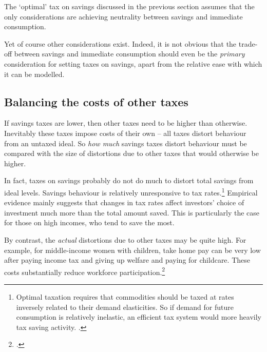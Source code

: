 The ‘optimal’ tax on savings discussed in the previous section assumes that the only considerations are achieving neutrality between savings and immediate consumption.

Yet of course other considerations exist. Indeed, it is not obvious that the trade-off between savings and immediate consumption should even be the \emph{primary} consideration for setting taxes on savings, apart from the relative ease with which it can be modelled.
\subsection{Balancing the costs of other taxes}
If savings taxes are lower, then other taxes need to be higher than otherwise. Inevitably these taxes impose costs of their own – all taxes distort behaviour from an untaxed ideal. So \emph{how much} savings taxes distort behaviour must be compared with the size of distortions due to other taxes that would otherwise be higher.

In fact, taxes on savings probably do not do much to distort total savings from ideal levels. Savings behaviour is relatively unresponsive to tax rates.\footnote{Optimal taxation requires that commodities should be taxed at rates inversely related to their demand elasticities. So if demand for future consumption is relatively inelastic, an efficient tax system would more heavily tax saving activity. \textcite[See:][21--22]{Ingles2015}.}  Empirical evidence mainly suggests that changes in tax rates affect investors’ choice of investment much more than the total amount saved. This is particularly the case for those on high incomes, who tend to save the most.

By contrast, the \emph{actual} distortions due to other taxes may be quite high. For example, for middle-income women with children, take home pay can be very low after paying income tax and giving up welfare and paying for childcare. These costs substantially reduce workforce participation.\footcite[44--47]{DaleyMcGannonGinnivan2012}

